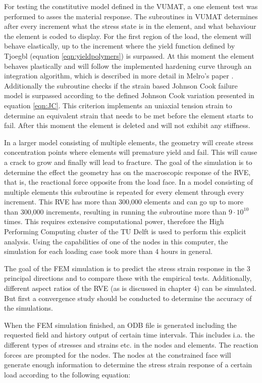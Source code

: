 For testing the constitutive model defined in the VUMAT, a one element test was performed to asses the material response. The subroutines in VUMAT determines after every increment what the stress state is in the element, and what behaviour the element is coded to display. For the first region of the load, the element will behave elastically, up to the increment where the yield function defined by Tjoegbl (equation \ref{eqn:yieldpolymers}) is surpassed. At this moment the element behaves plastically and will follow the implemented hardening curve through an integration algorithm, which is described in more detail in Melro's paper \cite{Melro2013MicromechanicalModelling}.  Additionally the subroutine checks if the strain based Johnson Cook failure model is surpassed according to the defined Johnson Cook variation presented in equation \ref{eqn:JC}. This criterion implements an uniaxial tension strain to determine an equivalent strain that needs to be met before the element starts to fail. After this moment the element is deleted and will not exhibit any stiffness. 

In a larger model consisting of multiple elements, the geometry will create stress concentration points where elements will premature yield and fail. This will cause a crack to grow and finally will lead to fracture. The goal of the simulation is to determine the effect the geometry has on the macroscopic response of the RVE, that is, the reactional force opposite from the load face.
In a model consisting of multiple elements this subroutine is repeated for every element through every increment. This RVE has more than 300,000 elements and can go up to more than 300,000 increments, resulting in running the subroutine more than $9\cdot 10^{10}$ times. This requires extensive computational power, therefore the High Performing Computing cluster of the TU Delft is used to perform this explicit analysis. Using the capabilities of one of the nodes in this computer, the simulation for each loading case took more than 4 hours in general.

The goal of the FEM simulation is to predict the stress strain response in the 3 principal directions and to compare these with the empirical tests. Additionally, different aspect ratios of the RVE (as is discussed in chapter 4) can be simulated. But first a convergence study should be conducted to determine the accuracy of the simulations.

When the FEM simulation finished, an ODB file is generated including the requested field and history output of certain time intervals. This includes i.a. the different types of stresses and strains etc. in the nodes and elements. The reaction forces are prompted for the nodes. The nodes at the constrained face will generate enough information to determine the stress strain response of a certain load according to the following equation: 

